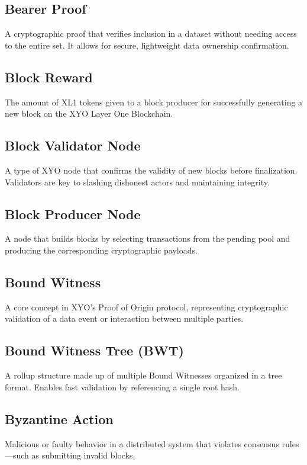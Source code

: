 \documentclass{article}
\begin{document}
\subsection*{Bearer Proof}
A cryptographic proof that verifies inclusion in a dataset without needing
access to the entire set. It allows for secure, lightweight data ownership
confirmation.

\subsection*{Block Reward}
The amount of XL1 tokens given to a block producer for successfully generating
a new block on the XYO Layer One Blockchain.

\subsection*{Block Validator Node}
A type of XYO node that confirms the validity of new blocks before
finalization. Validators are key to slashing dishonest actors and maintaining
integrity.

\subsection*{Block Producer Node}
A node that builds blocks by selecting transactions from the pending pool and
producing the corresponding cryptographic payloads.

\subsection*{Bound Witness}
A core concept in XYO's Proof of Origin protocol, representing cryptographic
validation of a data event or interaction between multiple parties.

\subsection*{Bound Witness Tree (BWT)}
A rollup structure made up of multiple Bound Witnesses organized in a tree
format. Enables fast validation by referencing a single root hash.

\subsection*{Byzantine Action}
Malicious or faulty behavior in a distributed system that violates consensus
rules—such as submitting invalid blocks.
\end{document}
